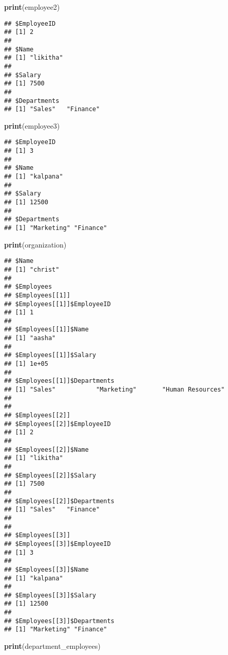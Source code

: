 \documentclass[
]{article}
\newenvironment{Shaded}{\begin{snugshade}}{\end{snugshade}}
\newcommand{\FunctionTok}[1]{\textcolor[rgb]{0.13,0.29,0.53}{\textbf{#1}}}
\newcommand{\NormalTok}[1]{#1}
\begin{document}
\begin{Shaded}
\begin{Highlighting}[]
\FunctionTok{print}\NormalTok{(employee2)}
\end{Highlighting}
\end{Shaded}

\begin{verbatim}
## $EmployeeID
## [1] 2
## 
## $Name
## [1] "likitha"
## 
## $Salary
## [1] 7500
## 
## $Departments
## [1] "Sales"   "Finance"
\end{verbatim}

\begin{Shaded}
\begin{Highlighting}[]
\FunctionTok{print}\NormalTok{(employee3)}
\end{Highlighting}
\end{Shaded}

\begin{verbatim}
## $EmployeeID
## [1] 3
## 
## $Name
## [1] "kalpana"
## 
## $Salary
## [1] 12500
## 
## $Departments
## [1] "Marketing" "Finance"
\end{verbatim}

\begin{Shaded}
\begin{Highlighting}[]
\FunctionTok{print}\NormalTok{(organization)}
\end{Highlighting}
\end{Shaded}

\begin{verbatim}
## $Name
## [1] "christ"
## 
## $Employees
## $Employees[[1]]
## $Employees[[1]]$EmployeeID
## [1] 1
## 
## $Employees[[1]]$Name
## [1] "aasha"
## 
## $Employees[[1]]$Salary
## [1] 1e+05
## 
## $Employees[[1]]$Departments
## [1] "Sales"           "Marketing"       "Human Resources"
## 
## 
## $Employees[[2]]
## $Employees[[2]]$EmployeeID
## [1] 2
## 
## $Employees[[2]]$Name
## [1] "likitha"
## 
## $Employees[[2]]$Salary
## [1] 7500
## 
## $Employees[[2]]$Departments
## [1] "Sales"   "Finance"
## 
## 
## $Employees[[3]]
## $Employees[[3]]$EmployeeID
## [1] 3
## 
## $Employees[[3]]$Name
## [1] "kalpana"
## 
## $Employees[[3]]$Salary
## [1] 12500
## 
## $Employees[[3]]$Departments
## [1] "Marketing" "Finance"
\end{verbatim}

\begin{Shaded}
\begin{Highlighting}[]
\FunctionTok{print}\NormalTok{(department\_employees)}
\end{Highlighting}
\end{Shaded}
\end{document}
